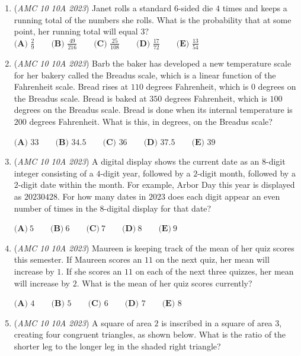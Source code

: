 \begin{enumerate}
 $\textbf{(A) } 42 \qquad \textbf{(B) } 63 \qquad \textbf{(C) } 84 \qquad \textbf{(D) } 126 \qquad \textbf{(E) } 252$


	\item (\textit{AMC 10 10A 2023}) Janet rolls a standard $6$-sided die $4$ times and keeps a running total of the numbers she rolls. What is the probability that at some point, her running total will equal $3?$
$\textbf{(A) }\frac{2}{9}\qquad\textbf{(B) }\frac{49}{216}\qquad\textbf{(C) }\frac{25}{108}\qquad\textbf{(D) }\frac{17}{72}\qquad\textbf{(E) }\frac{13}{54}$


	\item (\textit{AMC 10 10A 2023}) Barb the baker has developed a new temperature scale for her bakery called the Breadus scale, which is a linear function of the Fahrenheit scale. Bread rises at $110$ degrees Fahrenheit, which is $0$ degrees on the Breadus scale. Bread is baked at $350$ degrees Fahrenheit, which is $100$ degrees on the Breadus scale. Bread is done when its internal temperature is $200$ degrees Fahrenheit. What is this, in degrees, on the Breadus scale?


 $\textbf{(A) }33\qquad\textbf{(B) }34.5\qquad\textbf{(C) }36\qquad\textbf{(D) }37.5\qquad\textbf{(E) }39$


	\item (\textit{AMC 10 10A 2023}) A digital display shows the current date as an $8$-digit integer consisting of a $4$-digit year, followed by a $2$-digit month, followed by a $2$-digit date within the month. For example, Arbor Day this year is displayed as $20230428.$ For how many dates in $2023$ does each digit appear an even number of times in the $8$-digital display for that date?


 $\textbf{(A)}~5\qquad\textbf{(B)}~6\qquad\textbf{(C)}~7\qquad\textbf{(D)}~8\qquad\textbf{(E)}~9$


	\item (\textit{AMC 10 10A 2023}) Maureen is keeping track of the mean of her quiz scores this semester. If Maureen scores an $11$ on the next quiz, her mean will increase by $1$. If she scores an $11$ on each of the next three quizzes, her mean will increase by $2$. What is the mean of her quiz scores currently? 


 $\textbf{(A) }4\qquad\textbf{(B) }5\qquad\textbf{(C) }6\qquad\textbf{(D) }7\qquad\textbf{(E) }8$


	\item (\textit{AMC 10 10A 2023}) A square of area $2$ is inscribed in a square of area $3$, creating four congruent triangles, as shown below. What is the ratio of the shorter leg to the longer leg in the shaded right triangle? 



\end{enumerate}

